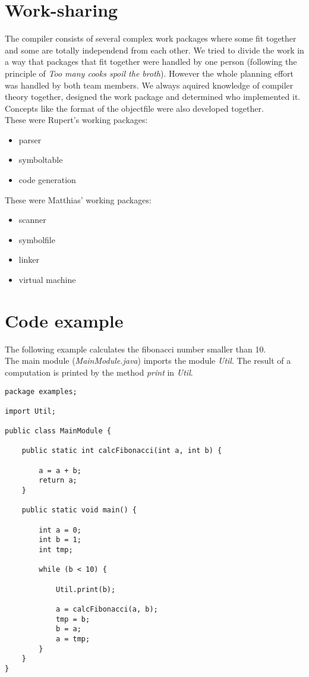 \section{Work-sharing}
\label{appendix:work-sharing}
The compiler consists of several complex work packages where some fit together
and some are totally independend from each other. We tried to divide the work in
a way that packages that fit together were handled by one person (following the
principle of \emph{Too many cooks spoil the broth}). 
However the whole planning effort was handled by both team members. We always
aquired knowledge of compiler theory together, designed the work package and
determined who implemented it. Concepts like the format of the objectfile were
also developed together. \\
These were Rupert's working packages:
\begin{itemize}
  \item parser
  \item symboltable
  \item code generation
\end{itemize}
These were Matthias' working packages:
\begin{itemize}
  \item scanner
  \item symbolfile
  \item linker
  \item virtual machine
\end{itemize}

\section{Code example}
The following example calculates the fibonacci number smaller than 10. \\
The main module (\emph{MainModule.java}) imports the module \emph{Util}. The
result of a computation is printed by the method \emph{print} in \emph{Util}. 

\begin{lstlisting}[caption="MainModule.java"]
package examples;

import Util;

public class MainModule {

	public static int calcFibonacci(int a, int b) {
		
		a = a + b;
		return a;
	}
	
	public static void main() {
	
		int a = 0;
		int b = 1;
		int tmp;
		
		while (b < 10) {
			
			Util.print(b);
			
			a = calcFibonacci(a, b);
			tmp = b;
			b = a; 
			a = tmp;	
		}	
	}	
}
\end{lstlisting}

